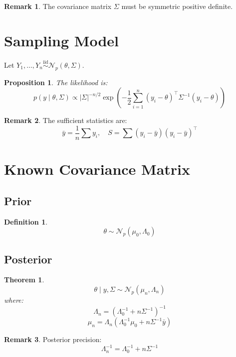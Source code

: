 \documentclass[12pt,oneside]{book}
\numberwithin{equation}{section}
\theoremstyle{definition}
\newtheorem{definition}{Definition}[section]
\newtheorem{remark}{Remark}[section]
\theoremstyle{plain}
\newtheorem{theorem}{Theorem}[section]
\newtheorem{proposition}{Proposition}[section]
\theoremstyle{remark}
\newcommand{\iid}{\overset{\text{iid}}{\sim}}
\newcommand{\Normal}{\mathcal{N}}
\begin{document}
\begin{remark}
The covariance matrix $\Sigma$ must be symmetric positive definite.
\end{remark}

\section{Sampling Model}

Let $Y_1, \dots, Y_n \iid \Normal_p(\theta, \Sigma)$.

\begin{proposition}
The likelihood is:
$$
p(y \mid \theta, \Sigma)
\propto
|\Sigma|^{-n/2}
\exp\left(
-\frac{1}{2}
\sum_{i=1}^n (y_i - \theta)^\top \Sigma^{-1} (y_i - \theta)
\right)
$$
\end{proposition}

\begin{remark}
The sufficient statistics are:
$$
\bar{y} = \frac{1}{n}\sum y_i, \quad
S = \sum (y_i - \bar{y})(y_i - \bar{y})^\top
$$
\end{remark}

\section{Known Covariance Matrix}

\subsection{Prior}

\begin{definition}
$$
\theta \sim \Normal_p(\mu_0, \Lambda_0)
$$
\end{definition}

\subsection{Posterior}

\begin{theorem}
$$
\theta \mid y, \Sigma \sim \Normal_p(\mu_n, \Lambda_n)
$$
where:
$$
\Lambda_n = \left(\Lambda_0^{-1} + n \Sigma^{-1}\right)^{-1}
$$
$$
\mu_n = \Lambda_n \left(\Lambda_0^{-1}\mu_0 + n \Sigma^{-1}\bar{y}\right)
$$
\end{theorem}

\begin{remark}
Posterior precision:
$$
\Lambda_n^{-1} = \Lambda_0^{-1} + n \Sigma^{-1}
$$
\end{remark}
\end{document}
